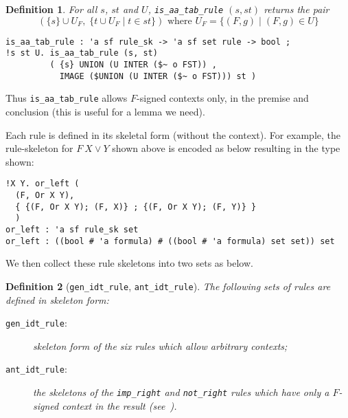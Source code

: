 \documentclass[a4paper]{article}
\newtheorem{definition}{Definition}
\begin{document}
\begin{definition}
For all $s$, $st$ and $U$,
  \texttt{is\_aa\_tab\_rule} $(s, st)$
  returns the pair
  \[
    (\{s\} \cup U_F, \;\{t \cup U_F \mid t\in st\})
    \mbox{ where }  U_F =  \{(F, g) \mid (F, g) \in U\}
  \]
\begin{verbatim}
is_aa_tab_rule : 'a sf rule_sk -> 'a sf set rule -> bool ;
!s st U. is_aa_tab_rule (s, st)
         ( {s} UNION (U INTER ($~ o FST)) , 
           IMAGE ($UNION (U INTER ($~ o FST))) st )
\end{verbatim}
\end{definition}

Thus
\texttt{is\_aa\_tab\_rule} allows $F$-signed contexts only, in the
premise and conclusion (this is useful for a lemma we need).

Each rule is defined in its skeletal form (without the
context). For example, the rule-skeleton for $F~ X \lor Y$ shown above
is encoded as below resulting in the type shown:
\begin{verbatim}
!X Y. or_left (
  (F, Or X Y), 
  { {(F, Or X Y); (F, X)} ; {(F, Or X Y); (F, Y)} }
  )
or_left : 'a sf rule_sk set
or_left : ((bool # 'a formula) # ((bool # 'a formula) set set)) set
\end{verbatim}

We then collect these rule skeletons into two sets as below.
\begin{definition}[\texttt{gen\_idt\_rule}, \texttt{ant\_idt\_rule}]
 The following sets of rules are defined in skeleton form:
 \begin{description}
 \item[\texttt{gen\_idt\_rule}:] skeleton form
  of the six rules which allow arbitrary contexts;
\item[\texttt{ant\_idt\_rule}:] the skeletons of the
  \texttt{imp\_right} and \texttt{not\_right} rules which have only a
   $F$-signed context in the result
   (see~\cite[Figure~1.6]{fitting-dual-tableau}).
 \end{description}
\end{definition}
\end{document}
